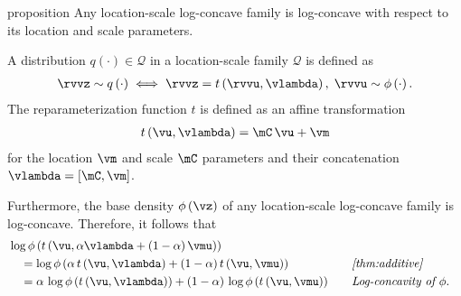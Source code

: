 \begin{theoremEnd}{proposition}\label{thm:logconcave_parameter}
  Any location-scale log-concave family is log-concave with respect to its location and scale parameters.
\end{theoremEnd}
\begin{proofEnd}
  A distribution \(q\left(\cdot\right) \in \mathcal{Q}\) in a location-scale family \(\mathcal{Q}\) is defined as
  \begin{align*}
    \rvvz \sim q\left(\cdot\right) \iff \rvvz = t\left(\rvvu, \vlambda\right),\; \rvvu \sim \phi\left(\cdot\right).
  \end{align*}
  The reparameterization function \(t\) is defined as an affine transformation
  \begin{align*}
    t\left(\vu, \vlambda\right) = \mC\,\vu + \vm
  \end{align*}
  for the location \(\vm\) and scale \(\mC\) parameters and their concatenation \(\vlambda = \left[\mC, \vm\right]\).

  Furthermore, the base density \(\phi\left(\vz\right)\) of any location-scale log-concave family is log-concave.
  Therefore, it follows that
  \begin{alignat}{2}
    &\log\phi\left(t\left(\vu, \alpha \vlambda + (1 - \alpha)\,\vmu\right)\right)
    \nonumber
    \\
    &\quad=
    \log\phi\left( \alpha\,t\left(\vu, \vlambda\right) + (1 - \alpha)\,t\left(\vu, \vmu\right)\right)
    &&\quad\text{\textit{\cref{thm:additive}}}
    \nonumber
    \\
    &\quad=
    \alpha\,\log\phi\left(t\left(\vu, \vlambda\right)\right) + (1 - \alpha)\,\log\phi\left(t\left(\vu, \vmu\right)\right)
    &&\quad\text{\textit{Log-concavity of \(\phi\)}}.
    \nonumber
  \end{alignat}
\end{proofEnd}

